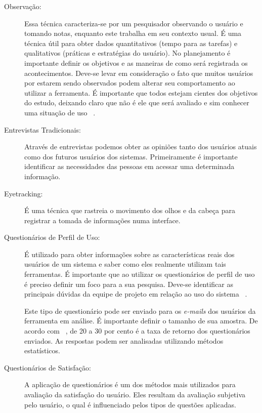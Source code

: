 \begin{description}

\item[Observação:]

	Essa técnica caracteriza-se por um pesquisador observando o usuário e tomando notas, enquanto este trabalha em seu contexto usual. É uma técnica útil para obter dados quantitativos (tempo para as tarefas) e qualitativos (práticas e estratégias do usuário). No planejamento é importante definir os objetivos e as maneiras de como será registrada os acontecimentos. Deve-se levar em consideração o fato que muitos usuários por estarem sendo observados podem alterar seu comportamento ao utilizar a ferramenta. É importante que todos estejam cientes dos objetivos do estudo, deixando claro que não é ele que será avaliado e sim conhecer uma situação de uso ~\cite{cybis2010}.

\item[Entrevistas Tradicionais:]

Através de entrevistas podemos obter as opiniões tanto dos usuários atuais como dos futuros usuários dos sistemas. Primeiramente é importante identificar as necessidades das pessoas em acessar uma determinada informação.

\item[Eyetracking:]

É uma técnica que rastreia o movimento dos olhos e da cabeça para registrar a tomada de informações numa interface.

\item[Questionários de Perfil de Uso:]
 
É utilizado para obter informações sobre as características reais dos usuários de um sistema e saber como eles realmente utilizam tais ferramentas. É importante que ao utilizar os questionários de perfil de uso é preciso definir um foco para a sua pesquisa. Deve-se identificar as principais dúvidas da equipe de projeto em relação ao uso do sistema ~\cite{cybis2010}.

Este tipo de questionário pode ser enviado para os \textit{e-mails} dos usuários da ferramenta em análise. É importante definir o tamanho de sua amostra. De acordo com ~, de 20 a 30 por cento é a taxa de retorno dos questionários enviados. As respostas podem ser analisadas utilizando métodos estatísticos.


\item[Questionários de Satisfação:]

	A aplicação de questionários é um dos métodos mais utilizados para avaliação da satisfação do usuário. Eles resultam da avaliação subjetiva pelo usuário, o qual é influenciado pelos tipos de questões aplicadas.
	

\end{description}

